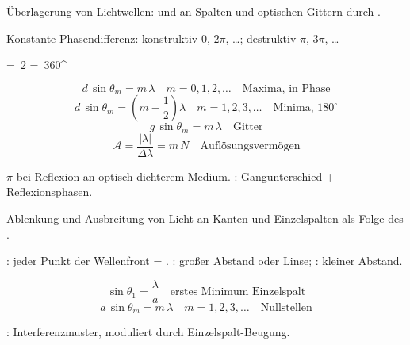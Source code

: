 \begin{runintext}
Überlagerung von Lichtwellen:  und  an Spalten und optischen Gittern durch .
\end{runintext}
\begin{runintext}
Konstante Phasendifferenz: konstruktiv $0$, $2\pi$, \ldots; destruktiv $\pi$, $3\pi$, \ldots
\end{runintext}
\begin{formulabox}
\begin{longformula}
\delta = \,2\pi
= \,360^\circ
\end{longformula}
\formulasep
\[ d\,\sin\theta_m = m\,\lambda \quad m = 0,1,2,\ldots \quad \text{Maxima, in Phase} \]
\[ d\,\sin\theta_m = \left(m-\frac{1}{2}\right)\lambda \quad m = 1,2,3,\ldots \quad \text{Minima, $180^\circ$} \]
\formulasep
\[ g\,\sin\theta_m = m\,\lambda \quad \text{Gitter} \]
\[ \mathcal{A} = \frac{|\lambda|}{\Delta\lambda} = m\,N \quad \text{Auflösungsvermögen} \]
\end{formulabox}
\begin{runintext}
 $\pi$ bei Reflexion an optisch dichterem Medium. : Gangunterschied + Reflexionsphasen.
\end{runintext}


\begin{runintext}
Ablenkung und Ausbreitung von Licht an Kanten und Einzelspalten als Folge des .
\end{runintext}
\begin{runintext}
: jeder Punkt der Wellenfront = . : großer Abstand oder Linse; : kleiner Abstand.
\end{runintext}
\begin{formulabox}
\[ \sin\theta_1 = \frac{\lambda}{a} \quad \text{erstes Minimum Einzelspalt} \]
\formulasep
\[ a\,\sin\theta_m = m\,\lambda \quad m = 1,2,3,\ldots \quad \text{Nullstellen} \]
\end{formulabox}
\begin{runintext}
: Interferenzmuster, moduliert durch Einzelspalt-Beugung.
\end{runintext}

